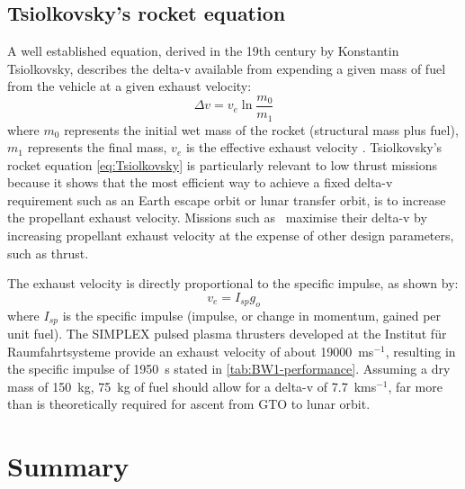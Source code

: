 \subsection{Tsiolkovsky's rocket equation} \label{sec:Tsiolkovsky}

A well established equation, derived in the 19th century by Konstantin Tsiolkovsky, describes the delta-v available from expending a given mass of fuel from the vehicle at a given exhaust velocity:
\begin{equation}
\Delta v=v_{e}\ln\frac{m_{0}}{m_{1}}\label{eq:Tsiolkovsky}
\end{equation}
where $m_{0}$ represents the initial wet mass of the rocket (structural mass plus fuel), $m_{1}$ represents the final mass, $v_{e}$ is the effective exhaust velocity \parencite{Tsiolkovsky1903,Chobotov2002}. Tsiolkovsky's rocket equation \eqref{eq:Tsiolkovsky} is particularly relevant to low thrust missions because it shows that the most efficient way to achieve a fixed delta-v requirement such as an Earth escape orbit or lunar transfer orbit, is to increase the propellant exhaust velocity. Missions such as \BW\ maximise their delta-v by increasing propellant exhaust velocity at the expense of other design parameters, such as thrust.

The exhaust velocity is directly proportional to the specific impulse, as shown by:
\begin{equation}
v_{e}=I_{sp}g_{o}\label{eq:Exhaust_velocity}
\end{equation}
where $I_{sp}$ is the specific impulse (impulse, or change in momentum, gained per unit fuel). The SIMPLEX pulsed plasma thrusters developed at the Institut f\"{u}r Raumfahrtsysteme \parencite{Nawaz2008} provide an exhaust velocity of about 19000~ms$^{-1}$, resulting in the specific impulse of 1950~s stated in \autoref{tab:BW1-performance}. Assuming a dry mass of 150~kg, 75~kg of fuel should allow for a delta-v of 7.7~kms$^{-1}$, far more than is theoretically required for ascent from GTO to lunar orbit.

\section{Summary} 


